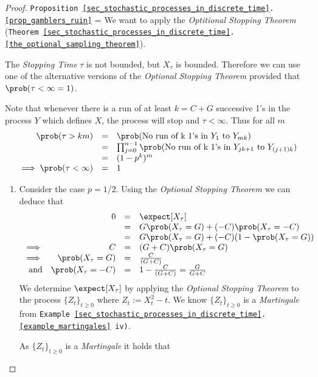 \documentclass[11pt,a4paper]{article}
\begin{document}
    \begin{proof}{\texttt{Proposition \ref{sec_stochastic_processes_in_discrete_time}.\ref{prop_gamblers_ruin}}}
      \everymath={\displaystyle}
      We want to apply the \textit{Optitional Stopping Theorem} (\texttt{Theorem \ref{sec_stochastic_processes_in_discrete_time}.\ref{the_optional_sampling_theorem}}).
      \par The \textit{Stopping Time} $\tau$ is not bounded, but $X_\tau$ is bounded. Therefore we can use one of the alternative versions of the \textit{Optional Stopping Theorem} provided that $\prob(\tau<\infty=1)$.
      \par Note that whenever there is a run of at least $k=C+G$ successive 1's in the process $Y$ which defines $X$, the process will stop and $\tau<\infty$. Thus for all $m$
      \[\begin{array}{rcl}
        \prob(\tau>km)&=&\prob(\text{No run of k 1's in }Y_1\text{ to }Y_{mk})\\
        &=&\prod_{j=0}^{n-1}\prob(\text{No run of k 1's in }Y_{jk+1}\text{ to }Y_{(j+1)k})\\
        &=&(1-p^k)^m\\
        \implies\prob(\tau<\infty)&=&1
      \end{array}\]
      \begin{enumerate}
        \item Consider the case $p=1/2$. Using the \textit{Optional Stopping Theorem} we can deduce that
        \[\begin{array}{rrcl}
          &0&=&\expect[X_\tau]\\
          &&=&G\prob(X_\tau=G)+(-C)\prob(X_\tau=-C)\\
          &&=&G\prob(X_\tau=G)+(-C)(1-\prob(X_\tau=G))\\
          \implies&C&=&(G+C)\prob(X_\tau=G)\\
          \implies&\prob(X_\tau=G)&=&\frac{C}{(G+C)}\\
          \text{and}&\prob(X_\tau=-C)&=&1-\frac{C}{(G+C)}=\frac{G}{G+C}\\
        \end{array}\]
        We determine $\expect[X_\tau]$ by applying the \textit{Optional Stopping Theorem} to the process $\{Z_t\}_{t\geq0}$ where $Z_t:=X_t^2-t$. We know $\{Z_t\}_{t\geq0}$ is a \textit{Martingale} from \texttt{Example \ref{sec_stochastic_processes_in_discrete_time}.\ref{example_martingales} iv)}.
        \par As $\{Z_t\}_{t\geq0}$ is a \textit{Martingale} it holds that

\end{enumerate}
\end{proof}
\end{document}
